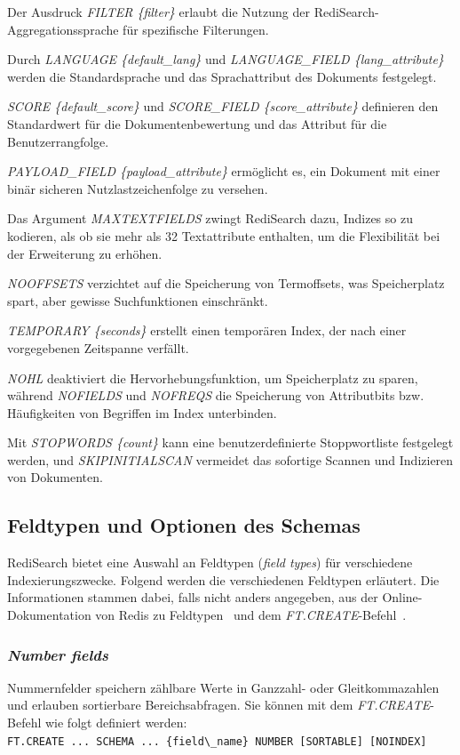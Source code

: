 Der Ausdruck \emph{FILTER \{filter\}} erlaubt die Nutzung der RediSearch-Ag\-gre\-ga\-ti\-ons\-spra\-che für spezifische Filterungen.

Durch \emph{LANGUAGE \{default\_lang\}} und \emph{LANGUAGE\_FIELD \{lang\_attribute\}} werden die Standardsprache und das Sprachattribut des Dokuments festgelegt.

\emph{SCORE \{default\_score\}} und \emph{SCORE\_FIELD \{score\_attribute\}} definieren den Standardwert für die Dokumentenbewertung und das Attribut für die Benutzerrangfolge.

\emph{PAYLOAD\_FIELD \{payload\_attribute\}} ermöglicht es, ein Dokument mit einer binär sicheren Nutzlastzeichenfolge zu versehen.

Das Argument \emph{MAXTEXTFIELDS} zwingt RediSearch dazu, Indizes so zu kodieren, als ob sie mehr als 32 Textattribute enthalten, um die Flexibilität bei der Erweiterung zu erhöhen.

\emph{NOOFFSETS} verzichtet auf die Speicherung von Termoffsets, was Speicherplatz spart, aber gewisse Suchfunktionen einschränkt.

\emph{TEMPORARY \{seconds\}} erstellt einen temporären Index, der nach einer vorgegebenen Zeitspanne verfällt.

\emph{NOHL} deaktiviert die Hervorhebungsfunktion, um Speicherplatz zu sparen, während \emph{NOFIELDS} und \emph{NOFREQS} die Speicherung von Attributbits bzw. Häufigkeiten von Begriffen im Index unterbinden.

Mit \emph{STOPWORDS \{count\}} kann eine benutzerdefinierte Stoppwortliste festgelegt werden, und \emph{SKIPINITIALSCAN} vermeidet das sofortige Scannen und Indizieren von Dokumenten.




\subsection{Feldtypen und Optionen des Schemas}\label{sec:redisearch-schema-fieldtypes}
RediSearch bietet eine Auswahl an Feldtypen (\emph{field types}) für verschiedene Indexierungszwecke. Folgend werden die verschiedenen Feldtypen erläutert. Die Informationen stammen dabei, falls nicht anders angegeben, aus der Online-Dokumentation von Redis zu Feldtypen~\cite{redis_ltd_field_nodate} und dem \emph{FT.CREATE}-Befehl~\cite{redis_ltd_ftcreate_nodate}.

\subsubsection{\emph{Number fields}}
Nummernfelder speichern zählbare Werte in Ganzzahl- oder Gleitkommazahlen und erlauben sortierbare Bereichsabfragen. Sie können mit dem \emph{FT.CREATE}-Befehl wie folgt definiert werden:\\
\lstinline|FT.CREATE ... SCHEMA ... {field\_name} NUMBER [SORTABLE] [NOINDEX]|

